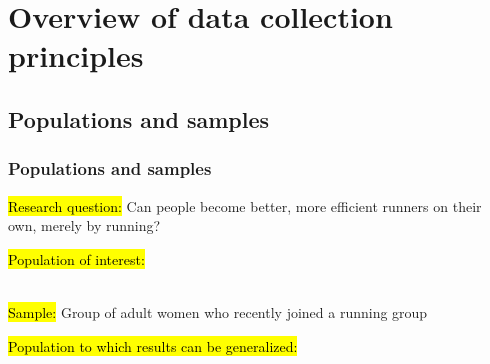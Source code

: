 
\section{Overview of data collection principles}


\subsection{Populations and samples}


\begin{frame}
\frametitle{Populations and samples}

{
\hl{Research question:} Can people become better, more efficient runners on their own, merely by running? \\

\pause 

\hl{Population of interest:} 
}
\pause 
$\:$ \\
\hl{Sample:} Group of adult women who recently joined a running group

\pause

\hl{Population to which results can be generalized:} 

\end{frame}


